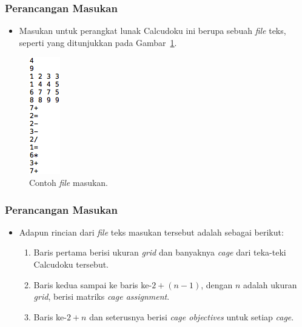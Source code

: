 \documentclass{beamer}
\begin{document}
\begin{frame}
\frametitle{Perancangan Masukan}
\begin{itemize}
\item Masukan untuk perangkat lunak Calcudoku ini berupa sebuah \textit{file} teks, seperti yang ditunjukkan pada Gambar~\ref{fig:perancanganmasukan}.
\end{itemize}
\begin{figure}
\centering
\captionsetup{justification=centering}
\includegraphics[scale=0.75]{Gambar/Perancangan/PerancanganInput.png}
\caption[Contoh \textit{file} masukan.]{Contoh \textit{file} masukan.}
\label{fig:perancanganmasukan}
\end{figure}
\end{frame}


\begin{frame}
\frametitle{Perancangan Masukan}
\begin{itemize}
\item Adapun rincian dari \textit{file} teks masukan tersebut adalah sebagai berikut:
	\begin{enumerate}
	\item Baris pertama berisi ukuran \textit{grid} dan banyaknya \textit{cage} dari teka-teki Calcudoku tersebut.
	\item Baris kedua sampai ke baris ke-\begin{math}2 + (n - 1)\end{math}, dengan \begin{math}n\end{math} adalah ukuran \textit{grid}, berisi matriks \textit{cage assignment}.
	\item Baris ke-\begin{math}2 + n\end{math} dan seterusnya berisi \textit{cage objectives} untuk setiap \textit{cage}.
	\end{enumerate}
\end{itemize}
\end{frame}
\end{document}
